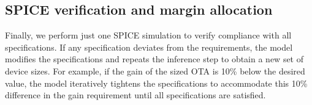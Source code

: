 
    

\subsection{SPICE verification and margin allocation}

\noindent
Finally, we perform just one SPICE simulation to verify compliance with all specifications. If any specification deviates from the requirements, the model modifies the specifications and repeats the inference step to obtain a new set of device sizes. For example, if the gain of the sized OTA is 10\% below the desired value, the model iteratively tightens the specifications to accommodate this 10\% difference in the gain requirement until all specifications are satisfied.
